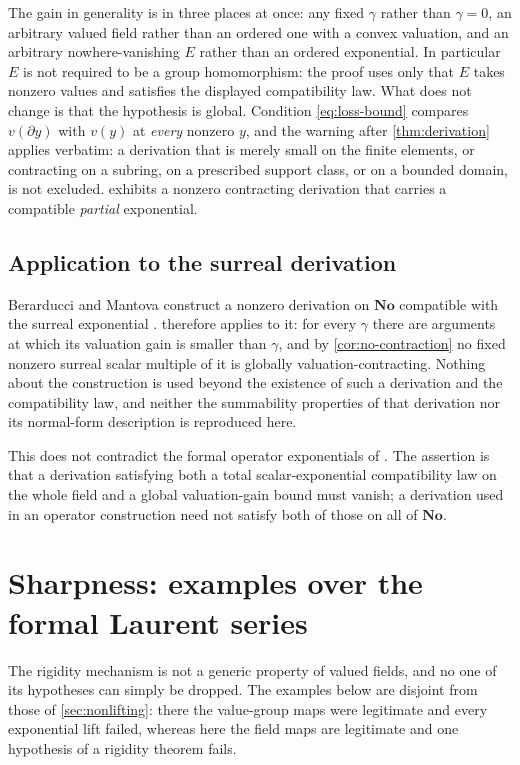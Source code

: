 \documentclass[11pt]{article}
\theoremstyle{definition}
\theoremstyle{remark}
\newcommand{\No}{\mathbf{No}}
\numberwithin{equation}{section}
\begin{document}
The gain in generality is in three places at once: any fixed $\gamma$ rather
than $\gamma=0$, an arbitrary valued field rather than an ordered one with a
convex valuation, and an arbitrary nowhere-vanishing $E$ rather than an
ordered exponential. In particular $E$ is not required to be a group
homomorphism: the proof uses only that $E$ takes nonzero values and
satisfies the displayed compatibility law. What does not change is that the
hypothesis is global. Condition \eqref{eq:loss-bound} compares
$v(\partial y)$ with $v(y)$ at \emph{every} nonzero $y$, and the warning
after \cref{thm:derivation} applies verbatim: a derivation that is merely
small on the finite elements, or contracting on a subring, on a prescribed
support class, or on a bounded domain, is not excluded.
 exhibits a nonzero contracting derivation that carries a
compatible \emph{partial} exponential.

\subsection{Application to the surreal derivation}

Berarducci and Mantova construct a nonzero derivation on $\No$ compatible
with the surreal exponential \cite{BM}. 
therefore applies to it: for every $\gamma$ there are arguments at which its
valuation gain is smaller than $\gamma$, and by \cref{cor:no-contraction} no
fixed nonzero surreal scalar multiple of it is globally
valuation-contracting. Nothing about the construction is used beyond the
existence of such a derivation and the compatibility law, and neither the
summability properties of that derivation nor its normal-form description is
reproduced here.

This does not contradict the formal operator exponentials of
\cite{FormalSums}. The assertion is that a derivation satisfying both a
total scalar-exponential compatibility law on the whole field and a global
valuation-gain bound must vanish; a derivation used in an operator
construction need not satisfy both of those on all of $\No$.


\section{Sharpness: examples over the formal Laurent series}\label{sec:laurent}

The rigidity mechanism is not a generic property of valued fields, and no
one of its hypotheses can simply be dropped. The examples below are
disjoint from those of \cref{sec:nonlifting}: there the value-group maps
were legitimate and every exponential lift failed, whereas here the field
maps are legitimate and one hypothesis of a rigidity theorem fails.
\end{document}
